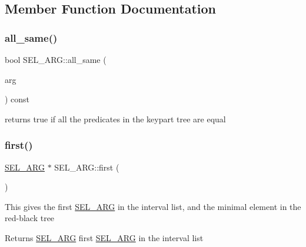 \subsection{Member Function Documentation}
\mbox{\label{classSEL__ARG_aef101e0a11dd01253175b280d12e2964}} 
\subsubsection{\texorpdfstring{all\+\_\+same()}{all\_same()}}
{\footnotesize\ttfamily bool S\+E\+L\+\_\+\+A\+R\+G\+::all\+\_\+same (\begin{DoxyParamCaption}\item[{const \mbox{\hyperlink{classSEL__ARG}{S\+E\+L\+\_\+\+A\+RG}} $\ast$}]{arg }\end{DoxyParamCaption}) const\hspace{0.3cm}{\ttfamily [inline]}}

returns true if all the predicates in the keypart tree are equal \mbox{\label{classSEL__ARG_a0a33bd4e8cba61765e62d60577857cb7}} 
\subsubsection{\texorpdfstring{first()}{first()}}
{\footnotesize\ttfamily \mbox{\hyperlink{classSEL__ARG}{S\+E\+L\+\_\+\+A\+RG}} $\ast$ S\+E\+L\+\_\+\+A\+R\+G\+::first (\begin{DoxyParamCaption}{ }\end{DoxyParamCaption})}

This gives the first \mbox{\hyperlink{classSEL__ARG}{S\+E\+L\+\_\+\+A\+RG}} in the interval list, and the minimal element in the red-\/black tree

\begin{DoxyReturn}{Returns}
\mbox{\hyperlink{classSEL__ARG}{S\+E\+L\+\_\+\+A\+RG}} first \mbox{\hyperlink{classSEL__ARG}{S\+E\+L\+\_\+\+A\+RG}} in the interval list 
\end{DoxyReturn}
\mbox{\label{classSEL__ARG_a2c17280d4f3bc57291e5b4c55ffa7fa1}} 
